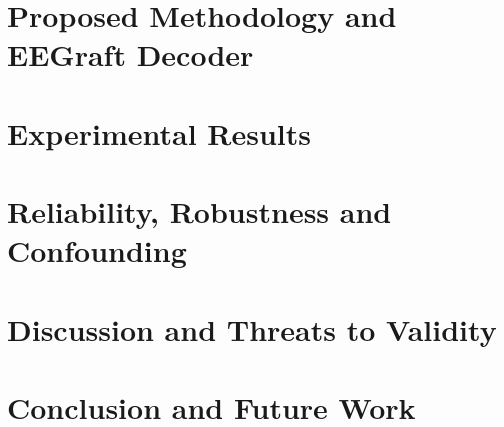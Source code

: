 \documentclass[12pt]{report}
\let\cleardoublepage\clearpage
\begin{document}
\chapter{Proposed Methodology and EEGraft Decoder}
\chapter{Experimental Results}
\chapter{Reliability, Robustness and Confounding}
\chapter{Discussion and Threats to Validity}
\chapter{Conclusion and Future Work}
\cleardoublepage{}
\printbibliography[heading=bibintoc,title={Bibliography}]
\appendix


\end{document}
